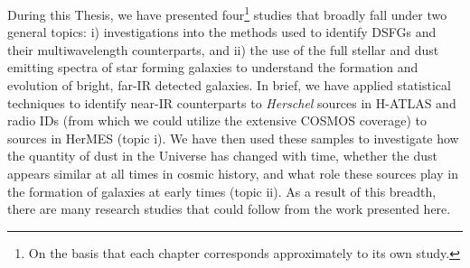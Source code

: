 During this Thesis, we have presented four\footnote{On the basis that each chapter corresponds approximately to its own study.} studies that broadly fall under two general topics: i) investigations into the methods used to identify DSFGs and their multiwavelength counterparts, and ii) the use of the full stellar and dust emitting spectra of star forming galaxies to understand the formation and evolution of bright, far-IR detected galaxies. In brief, we have applied statistical techniques to identify near-IR counterparts to \textit{Herschel} sources in H-ATLAS and radio IDs (from which we could utilize the extensive COSMOS coverage) to sources in HerMES (topic i). We have then used these samples to investigate how the quantity of dust in the Universe has changed with time, whether the dust appears similar at all times in cosmic history, and what role these sources play in the formation of galaxies at early times (topic ii). As a result of this breadth, there are many research studies that could follow from the work presented here.

